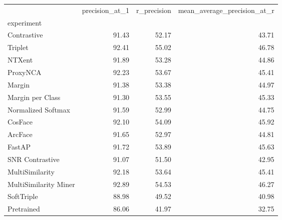 \begin{tabular}{lrrr}
\toprule
 & precision_at_1 & r_precision & mean_average_precision_at_r \\
experiment &  &  &  \\
\midrule
Contrastive & 91.43 & 52.17 & 43.71 \\
Triplet & 92.41 & 55.02 & 46.78 \\
NTXent & 91.89 & 53.28 & 44.86 \\
ProxyNCA & 92.23 & 53.67 & 45.41 \\
Margin & 91.38 & 53.38 & 44.97 \\
Margin per Class & 91.30 & 53.55 & 45.33 \\
Normalized Softmax & 91.59 & 52.99 & 44.75 \\
CosFace & 92.10 & 54.09 & 45.92 \\
ArcFace & 91.65 & 52.97 & 44.81 \\
FastAP & 91.72 & 53.89 & 45.63 \\
SNR Contrastive & 91.07 & 51.50 & 42.95 \\
MultiSimilarity & 92.18 & 53.64 & 45.41 \\
MultiSimilarity Miner & 92.89 & 54.53 & 46.27 \\
SoftTriple & 88.98 & 49.52 & 40.98 \\
Pretrained & 86.06 & 41.97 & 32.75 \\
\bottomrule
\end{tabular}

